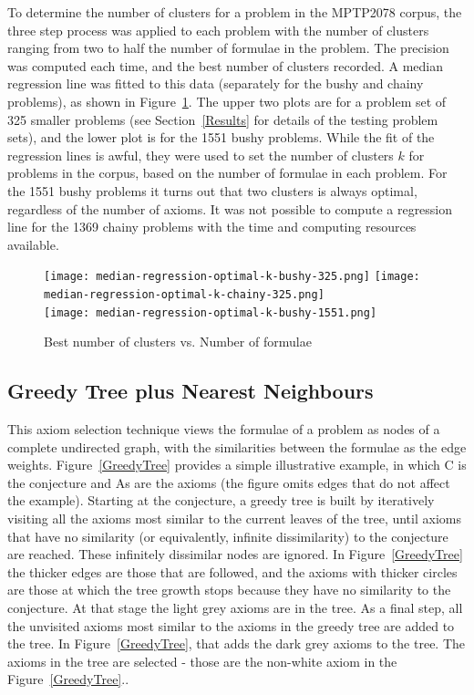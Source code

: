 \documentclass[EPiC]{easychair}
\begin{document}
To determine the number of clusters for a problem in the MPTP2078 corpus,
the three step process was applied to each problem with the number of 
clusters ranging from two to half the number of formulae in the problem.
The precision was computed each time, and the best number of clusters
recorded.
A median regression line was fitted to this data (separately for the
bushy and chainy problems), as shown in Figure~\ref{fig:median-regression}.
The upper two plots are for a problem set of 325 smaller problems (see
Section~\ref{Results} for details of the testing problem sets), and the
lower plot is for the 1551 bushy problems.
While the fit of the regression lines is awful, they were used to set the 
number of clusters $k$ for problems in the corpus, based on the number of 
formulae in each problem.
For the 1551 bushy problems it turns out that two clusters is always optimal,
regardless of the number of axioms.
It was not possible to compute a regression line for the 1369 chainy
problems with the time and computing resources available.

\begin{figure}[h]
\texttt{[image: median-regression-optimal-k-bushy-325.png]}
\texttt{[image: median-regression-optimal-k-chainy-325.png]}\\
\texttt{[image: median-regression-optimal-k-bushy-1551.png]}
\caption{Best number of clusters vs. Number of formulae}
\label{fig:median-regression}
\end{figure}

\subsection{Greedy Tree plus Nearest Neighbours}
\label{Zihao}

This axiom selection technique views the formulae of a problem as nodes
of a complete undirected graph, with the similarities between the formulae 
as the edge weights.
Figure~\ref{GreedyTree} provides a simple illustrative example, in which
{\sf C} is the conjecture and {\sf A}s are the axioms (the figure
omits edges that do not affect the example).
Starting at the conjecture, a greedy tree is built by iteratively visiting all
the axioms most similar to the current leaves of the tree, until axioms that 
have no similarity (or equivalently, infinite dissimilarity) 
to the conjecture are reached. 
These infinitely dissimilar nodes are ignored.
In Figure~\ref{GreedyTree} the thicker edges are those that are followed,
and the axioms with thicker circles are those at which the tree growth 
stops because they have no similarity to the conjecture.
At that stage the light grey axioms are in the tree.
As a final step, all the unvisited axioms most similar to the axioms in the 
greedy tree are added to the tree.
In Figure~\ref{GreedyTree}, that adds the dark grey axioms to the tree.
The axioms in the tree are selected - those are the non-white axiom in
the Figure~\ref{GreedyTree}..
\end{document}
